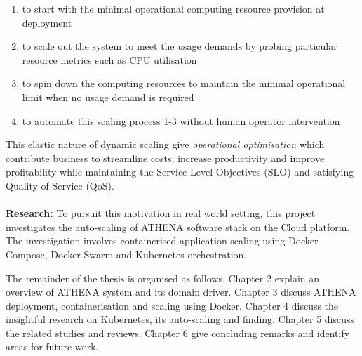\begin{enumerate}
\item to start with the minimal operational computing resource provision at deployment
\item to scale out the system to meet the usage demands by probing particular resource metrics such as CPU utilisation
\item to spin down the computing resources to maintain the minimal operational limit when no usage demand is required
\item to automate this scaling process 1-3 without human operator intervention
\end{enumerate}

This elastic nature of dynamic scaling give \emph{operational optimisation} which contribute business to streamline costs, increase productivity and improve profitability while maintaining the Service Level Objectives (SLO) and satisfying Quality of Service (QoS).
\\
\\
\textbf{Research:} \quad To pursuit this motivation in real world setting, this project investigates the auto-scaling of ATHENA software stack on the Cloud platform. The investigation involves containerised application scaling using Docker Compose, Docker Swarm and Kubernetes orchestration.



The remainder of the thesis is organised as follows. Chapter 2 explain an overview of ATHENA system and its domain driver. Chapter 3 discuss ATHENA deployment, containerisation and scaling using Docker. Chapter 4 discuss the insightful research on Kubernetes, its auto-scaling and finding. Chapter 5 discuss the related studies and reviews. Chapter 6 give concluding remarks and identify areas for future work.

